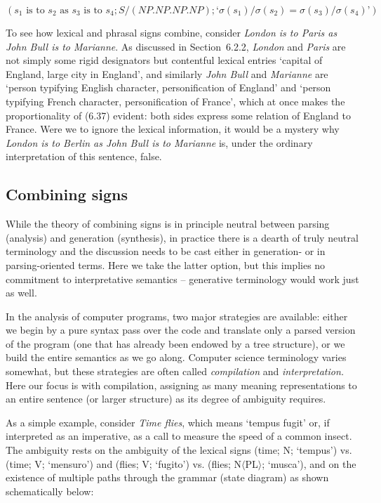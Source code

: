 \begin{equation}
(s_1 \text{ is to } s_2 \text{ as } s_3 \text{ is to } s_4; S/(NP.NP.NP.NP);
\text{`}\sigma(s_1)/\sigma(s_2)= \sigma(s_3)/\sigma(s_4)\text{'})
\end{equation}

\smallskip
\noindent
To see how lexical and phrasal signs combine, consider {\it London is to Paris
  as John Bull is to Marianne}. As discussed in Section~6.2.2, {\it London}
and {\it Paris} are not simply some rigid designators but contentful lexical
entries `capital of England, large city in England', and similarly {\it John
  Bull} and {\it Marianne} are `person typifying English character,
personification of England' and `person typifying French character,
personification of France', which at once makes the proportionality of (6.37)
evident: both sides express some relation of England to France. Were we to
ignore the lexical information, it would be a mystery why {\it London is to
  Berlin as John Bull is to Marianne} is, under the ordinary interpretation of
this sentence, false.

\subsection{Combining signs}

While the theory of combining signs is in principle neutral between parsing
(analysis) and generation (synthesis), in practice there is a dearth of truly
neutral terminology and the discussion needs to be cast either in generation-
or in parsing-oriented terms. Here we take the latter option, but this implies
no commitment to interpretative semantics -- generative terminology would 
work just as well. 

In the analysis of computer programs, two major strategies are available:
either we begin by a pure syntax pass over the code and translate only a
parsed version of the program (one that has already been endowed by a tree
structure), or we build the entire semantics as we go along. Computer science
terminology varies somewhat, but these strategies are often called {\it
  compilation} and {\it interpretation.} Here our focus is with compilation,
assigning as many meaning representations to an entire sentence (or larger
structure) as its degree of ambiguity requires. 

As a simple example, consider {\it Time flies}, which means `tempus fugit' or,
if interpreted as an imperative, as a call to measure the speed of a common
insect. The ambiguity rests on the ambiguity of the lexical signs (time; N;
`tempus') vs. (time; V; `mensuro') and (flies; V; `fugito') vs. (flies;
N$\langle$PL$\rangle$; `musca'), and on the existence of multiple paths
through the grammar (state diagram) as shown schematically below:

